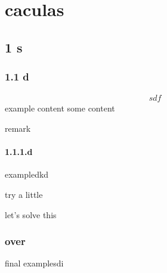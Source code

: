\chapter{caculas}
\section{1 s}
\subsection{1.1 d}

\begin{example}

\begin{align*}
sdf
\end{align*}
example content
some content
\end{example}

\begin{remark}
remark
\end{remark}

\subsubsection{1.1.1.d}

\begin{example}
exampledkd
\end{example}

\begin{exercise}
try a little
\end{exercise}

\begin{solution}
let's solve this
\end{solution}

\subsection{over}

\begin{example}
final examplesdi
\end{example}
